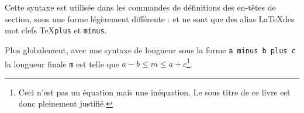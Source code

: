 \begin{latexcode}
\vspace{2.5cm minus 1.5cm plus 0.5cm}
\end{latexcode}

Cette syntaxe est utilisée dans les commandes de définitions des en-têtes de section, sous une forme légèrement différente :  et  ne sont que des alias \LaTeX des mot clefs \TeX \verb|plus| et \verb|minus|.

Plus globalement, avec une syntaxe de longueur sous la forme \verb|a minus b plus c| la longueur finale \verb|m| est telle que $ a - b \leq m \leq a + c $\footnote{Ceci n'est pas un équation mais une inéquation. Le sous titre de ce livre est donc pleinement justifié.}.  

